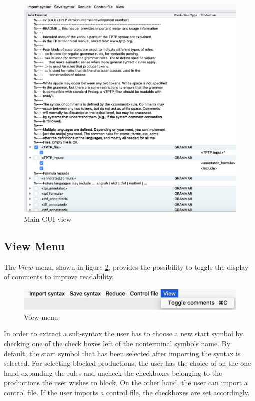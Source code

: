 \begin{figure}[H]
\centering
\includegraphics[width=1\textwidth]{images/gui.png}
\caption{Main GUI view}
\label{fig:gui}
\end{figure}

\subsection{View Menu}\label{sec:ConceptGUIViewMenu}

The $View$ menu, shown in figure \ref{fig:view}, provides the possibility to toggle the display of comments to improve readability.

\begin{figure}[H]
\centering
\includegraphics[width=.7\textwidth]{images/view.png}
\caption{View menu}
\label{fig:view}
\end{figure}

In order to extract a sub-syntax the user has to choose a new start symbol by checking one of the check boxes left of the nonterminal symbols name. By default, the start symbol that has been selected after importing the syntax is selected. For selecting blocked productions, the user has the choice of on the one hand expanding the rules and uncheck the checkboxes belonging to the productions the user wishes to block. On the other hand, the user can import a control file. If the user imports a control file, the checkboxes are set accordingly.

